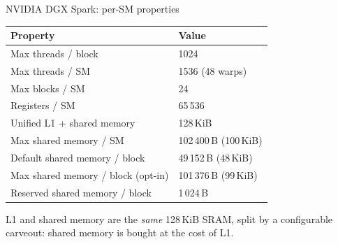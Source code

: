 \documentclass[aspectratio=169, numbering=fraction]{beamer}
\begin{document}
\begin{frame}{NVIDIA DGX Spark: per-SM properties}
  \vspace{0.7em}
  \small
  \begin{tabular}{ll}
    \toprule
    \textbf{Property} & \textbf{Value} \\
    \midrule
    Max threads / block                  & 1024 \\
    Max threads / SM                     & 1536 (48 warps) \\
    Max blocks / SM                      & 24 \\
    Registers / SM                       & 65\,536 \\
    \midrule
    Unified L1 + shared memory           & 128\,KiB \\
    Max shared memory / SM               & 102\,400\,B (100\,KiB) \\
    Default shared memory / block        & 49\,152\,B (48\,KiB) \\
    Max shared memory / block (opt-in)   & 101\,376\,B (99\,KiB) \\
    Reserved shared memory / block       & 1\,024\,B \\
    \bottomrule
  \end{tabular}
  
  \vspace{0.8em}
  \footnotesize
  L1 and shared memory are the \emph{same} 128\,KiB SRAM, split by a configurable
  carveout: shared memory is bought at the cost of L1.
  
\end{frame}
\end{document}
